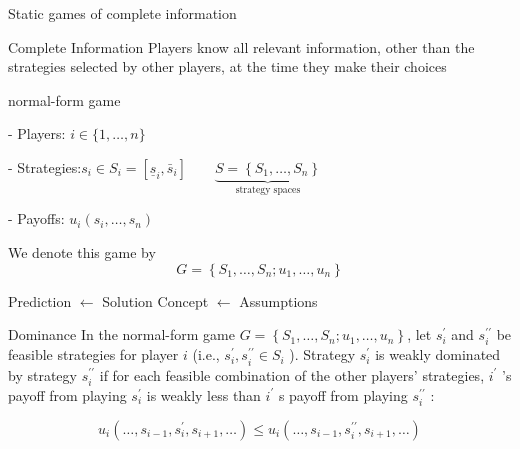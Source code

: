 \begin{titleboxchi}{Static games of complete information}
    
    \begin{definition}{Complete Information}
        Players know all relevant information, other than the strategies selected by other players, at the time they
        make their choices
    \end{definition}
    
    \begin{definition}{normal-form game}
        
        
        - Players: $i \in\{1, \ldots, n\}$
        
        - Strategies:$s_{i} \in S_{i}=\left[\underline{s}_{i}, \bar{s}_{i}\right] \qquad
        \underbrace{S=\left\{S_{1}, \ldots, S_{n}\right\}}_{\text{strategy spaces}}$
        
        - Payoffs: $u_{i}\left(s_{i}, \ldots, s_{n}\right)$
        
        
        We denote this game by $$G=\left\{S_{1}, \ldots, S_{n} ; u_{1}, \ldots, u_{n}\right\}$$
    
    \end
    {definition}
    
    
    Prediction $\leftarrow$ Solution Concept $\leftarrow$ Assumptions
    
    \begin{definition}{Dominance}
        In the normal-form game $G=\left\{S_{1}, \ldots, S_{n} ; u_{1}, \ldots, u_{n}\right\}$, let $s_{i}^{\prime}$ and
        $s_{i}^{\prime \prime}$ be feasible strategies for player $i$ (i.e.,
        $s_{i}^{\prime}, s_{i}^{\prime \prime} \in S_{i}$ ). Strategy $s_{i}^{\prime}$ is weakly dominated by strategy
        $s_{i}^{\prime \prime}$ if for each feasible combination of the other players' strategies, $i^{\prime}$
        's payoff from playing $s_{i}^{\prime}$ is weakly less than $i^{\prime}$ s payoff from playing
        $s_{i}^{\prime \prime}$ :
        
        $$
        u_{i}\left(\ldots, s_{i-1}, s_{i}^{\prime}, s_{i+1}, \ldots\right) \leq u_{i}
        \left(\ldots, s_{i-1}, s_{i}^{\prime \prime}, s_{i+1}, \ldots\right)
        $$
        

\end{definition}
\end{titleboxchi}
